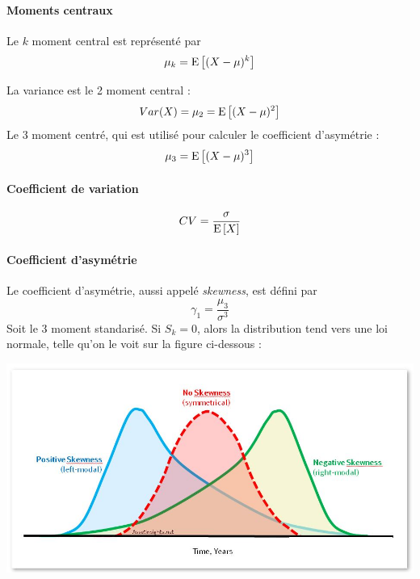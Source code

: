 \documentclass[12pt, french]{report}
\begin{document}
\paragraph{Moments centraux} Le $k$ moment central est représenté par
\begin{equation}
\mu_k = \mathrm{E} \left[ (X - \mu)^k \right]
\end{equation}

\begin{exemple}
La variance est le 2 moment central : 
\begin{align*}
Var(X) = \mu_2 =  \mathrm{E} \left[ (X - \mu)^2 \right] \\
\end{align*}
Le 3 moment centré, qui est utilisé pour calculer le coefficient d'asymétrie : 
\begin{align*}
\mu_3 = \mathrm{E} \left[ (X-\mu)^3 \right]
\end{align*}
\end{exemple}

\paragraph{Coefficient de variation}
\begin{equation}
CV = \frac{\sigma}{\mathrm{E} \left[ X \right]}
\end{equation}


\paragraph{Coefficient d'asymétrie}
Le coefficient d'asymétrie, aussi appelé \textit{skewness}, est défini par
\begin{equation}
\gamma_1 = \frac{\mu_3}{\sigma^3}
\end{equation}
Soit le 3 moment standarisé. Si $S_k = 0$, alors la distribution tend vers une loi normale, telle qu'on le voit sur la figure ci-dessous : 

\begin{center}
\includegraphics[scale=0.4]{Figures/skewness_interpretation.jpg}
\end{center}
\end{document}
